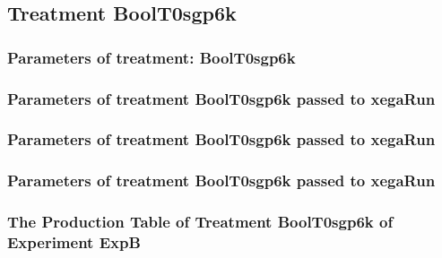 \documentclass[18pt,c]{beamer}
\makeatletter
\def\beamer@writeslidentry@miniframesoff{%
  \expandafter\beamer@ifempty\expandafter{\beamer@framestartpage}{}%
  {%
   \clearpage\beamer@notesactions%
  }
}
\newcommand*{\miniframesoff}{\let\beamer@writeslidentry=\beamer@writeslidentry@miniframesoff}
\makeatother
\begin{document}
\miniframesoff
\subsection{Treatment BoolT0sgp6k}

 \begin{frame}
 \fontsize{8pt}{9pt}\selectfont
 \frametitle{  Parameters of treatment: BoolT0sgp6k 
 }

 \label{ExpBtParmTable016.tex}  
 \end{frame}


 \begin{frame}
 \fontsize{8pt}{9pt}\selectfont
 \frametitle{  Parameters of treatment BoolT0sgp6k passed to xegaRun
 }

 \label{ExpBtParmTable017.tex}  
 \end{frame}


 \begin{frame}
 \fontsize{8pt}{9pt}\selectfont
 \frametitle{  Parameters of treatment BoolT0sgp6k passed to xegaRun
 }

 \label{ExpBtParmTable018.tex}  
 \end{frame}


 \begin{frame}
 \fontsize{8pt}{9pt}\selectfont
 \frametitle{  Parameters of treatment BoolT0sgp6k passed to xegaRun
 }

 \label{ExpBtParmTable019.tex}  
 \end{frame}

 \begin{frame}
 \fontsize{8pt}{9pt}\selectfont
 \frametitle{ The Production Table of Treatment BoolT0sgp6k of Experiment ExpB }

 \label{ExpBGrammarTable004.tex}  
 \end{frame}
\end{document}
